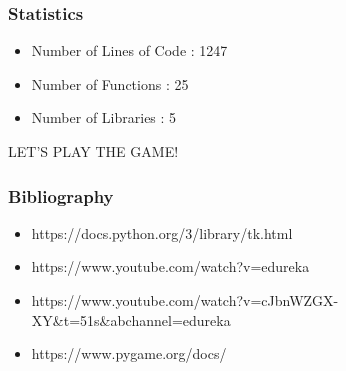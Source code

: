 \documentclass[15pt]{beamer}
\begin{document}
    \begin{frame}
    \frametitle{Statistics}
        \begin{itemize}
         \item Number of Lines of Code : 1247
         \item Number of Functions : 25
	 \item Number of Libraries : 5 
        \end{itemize}
    \end{frame}
    \begin{frame}
	    \begin{center}
		    LET'S PLAY THE GAME!
	    \end{center}
    \end{frame}
        


    \begin{frame}
	    \frametitle{Bibliography}
	    	\begin{itemize}
			\item https://docs.python.org/3/library/tk.html
			\item https://www.youtube.com/watch?v=edureka
			\item https://www.youtube.com/watch?v=cJbnWZGX-XY\&t=51s\&abchannel=edureka
			\item https://www.pygame.org/docs/
		 
		\end{itemize}
    \end{frame}
\end{document}
